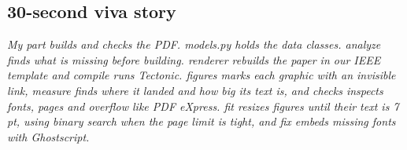 \documentclass[10.5pt,a4paper]{article}
\begin{document}
\subsection{30-second viva story}
\emph{My part builds and checks the PDF. models.py holds the data classes. analyze finds what is missing before
building. renderer rebuilds the paper in our IEEE template and compile runs Tectonic. figures marks each graphic
with an invisible link, measure finds where it landed and how big its text is, and checks inspects fonts, pages
and overflow like PDF eXpress. fit resizes figures until their text is 7 pt, using binary search when the page
limit is tight, and fix embeds missing fonts with Ghostscript.}
\end{document}
